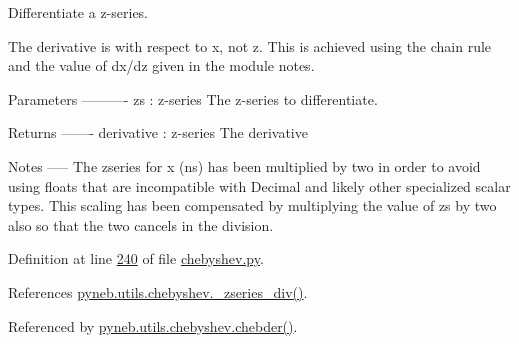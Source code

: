 \begin{DoxyVerb}Differentiate a z-series.

The derivative is with respect to x, not z. This is achieved using the
chain rule and the value of dx/dz given in the module notes.

Parameters
----------
zs : z-series
    The z-series to differentiate.

Returns
-------
derivative : z-series
    The derivative

Notes
-----
The zseries for x (ns) has been multiplied by two in order to avoid
using floats that are incompatible with Decimal and likely other
specialized scalar types. This scaling has been compensated by
multiplying the value of zs by two also so that the two cancels in the
division.\end{DoxyVerb}
 

Definition at line \hyperlink{chebyshev_8py_source_l00240}{240} of file \hyperlink{chebyshev_8py_source}{chebyshev.\-py}.



References \hyperlink{chebyshev_8py_source_l00174}{pyneb.\-utils.\-chebyshev.\-\_\-zseries\-\_\-div()}.



Referenced by \hyperlink{chebyshev_8py_source_l00841}{pyneb.\-utils.\-chebyshev.\-chebder()}.


